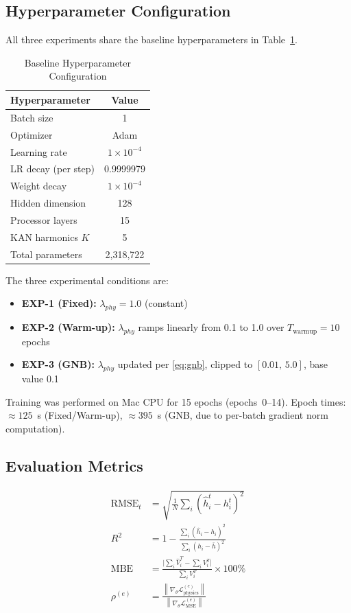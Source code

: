 \documentclass[conference]{IEEEtran}
\newcommand{\norm}[1]{\left\lVert#1\right\rVert}
\begin{document}
\subsection{Hyperparameter Configuration}
All three experiments share the baseline hyperparameters in
Table~\ref{tab:hyperparams}.

\begin{table}[htbp]
\caption{Baseline Hyperparameter Configuration}
\label{tab:hyperparams}
\centering
\begin{tabular}{lc}
\toprule
\textbf{Hyperparameter} & \textbf{Value} \\
\midrule
Batch size            & 1 \\
Optimizer             & Adam \\
Learning rate         & $1\times10^{-4}$ \\
LR decay (per step)   & 0.9999979 \\
Weight decay          & $1\times10^{-4}$ \\
Hidden dimension      & 128 \\
Processor layers      & 15 \\
KAN harmonics $K$     & 5 \\
Total parameters      & 2,318,722 \\
\bottomrule
\end{tabular}
\end{table}

\noindent The three experimental conditions are:
\begin{itemize}
  \item \textbf{EXP-1 (Fixed):} $\lambda_{phy}=1.0$ (constant)
  \item \textbf{EXP-2 (Warm-up):} $\lambda_{phy}$ ramps linearly from
        0.1 to 1.0 over $T_{\text{warmup}}=10$ epochs
  \item \textbf{EXP-3 (GNB):} $\lambda_{phy}$ updated per
        \eqref{eq:gnb}, clipped to $[0.01,\,5.0]$, base value 0.1
\end{itemize}
Training was performed on Mac CPU for 15 epochs (epochs~0--14). Epoch
times: ${\approx}125$~s (Fixed/Warm-up), ${\approx}395$~s (GNB, due to
per-batch gradient norm computation).

\subsection{Evaluation Metrics}
\begin{align}
  \text{RMSE}_t &= \sqrt{\tfrac{1}{N}\sum_i(\hat{h}_i^t - h_i^t)^2}\\
  R^2 &= 1 - \frac{\sum_i(\hat{h}_i-h_i)^2}{\sum_i(h_i-\bar{h})^2}\\
  \text{MBE} &= \frac{\bigl|\sum_i\hat{V}_i^T-\sum_iV_i^T\bigr|}
                     {\sum_iV_i^T}\times100\%\\
  \rho^{(e)} &= \frac{\norm{\nabla_\theta\mathcal{L}_{\text{physics}}^{(e)}}}
                     {\norm{\nabla_\theta\mathcal{L}_{\text{MSE}}^{(e)}}}
\end{align}
\end{document}
